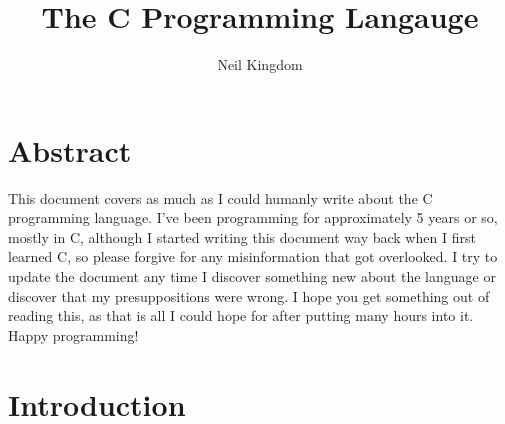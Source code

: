 \documentclass{article}
\title{The C Programming Langauge}
\author{Neil Kingdom}
\begin{document}
\begin{titlingpage}

\maketitle

\end{titlingpage}

\newpage

\tableofcontents

\newpage

\section{Abstract}

This document covers as much as I could humanly write about the C programming language. I’ve been programming
for approximately 5 years or so, mostly in C, although I started writing this document way back when I first
learned C, so please forgive for any misinformation that got overlooked. I try to update the document any time
I discover something new about the language or discover that my presuppositions were wrong. I hope you get
something out of reading this, as that is all I could hope for after putting many hours into it. Happy
programming!

\section{Introduction}
\end{document}
